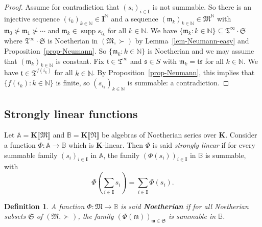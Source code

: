 \documentclass{article}
\newcommand{\of}{:}
\newcommand{\suchthat}{:}
\newcommand{\tmem}[1]{{\em #1\/}}
\newcommand{\tmop}[1]{\ensuremath{\operatorname{#1}}}
\newcommand{\tmstrong}[1]{\textbf{#1}}
\newtheorem{definition}[theorem]{Definition}
\theoremstyle{remark}\newtheorem*{convention*}{Convention}
\begin{document}
\begin{proof}
  Assume for contradiction that $(s_i)_{i \in \mathbf{I}}$ is not summable. So
  there is an injective sequence $(i_k)_{k \in \mathbb{N}} \in
  \mathbf{I}^{\mathbb{N}}$ and a sequence $(\mathfrak{m}_k)_{k \in \mathbb{N}}
  \in \mathfrak{M}^{\mathbb{N}}$ with $\mathfrak{m}_0 \nsucc \mathfrak{m}_1
  \nsucc \cdots$ and $\mathfrak{m}_k \in \tmop{supp} s_{i_k}$ for all $k \in
  \mathbb{N}$. We have $\{ \mathfrak{m}_k \suchthat k \in \mathbb{N} \}
  \subseteq \mathfrak{T}^{\infty} \cdot \mathfrak{S}$ where
  $\mathfrak{T}^{\infty} \cdot \mathfrak{S}$ is Noetherian in $(\mathfrak{M},
  \succ)$ by Lemma~\ref{lem-Neumann-easy} and Proposition~\ref{prop-Neumann}. So $\{
  \mathfrak{m}_k \suchthat k \in \mathbb{N} \}$ is Noetherian and we may
  assume that $(\mathfrak{m}_k)_{k \in \mathbb{N}}$ is constant. Fix
  $\mathfrak{t} \in \mathfrak{T}^{\infty}$ and $\mathfrak{s} \in S$ with
  $\mathfrak{m}_k =\mathfrak{t}\mathfrak{s}$ for all $k \in \mathbb{N}$. We
  have $\mathfrak{t} \in \mathfrak{T}^{f (i_k)}$ for all $k \in \mathbb{N}$.
  By Proposition~\ref{prop-Neumann}, this implies that $\{ f (i_k) \suchthat k \in
  \mathbb{N} \}$ is finite, so $(s_{i_k})_{k \in \mathbb{N}}$ is summable: a
  contradiction.
\end{proof}

\subsection{Strongly linear functions}

Let $\mathbb{A}= \mathbf{K} \llbracket \mathfrak{M} \rrbracket$ and
$\mathbb{B}= \mathbf{K} \llbracket \mathfrak{N} \rrbracket$ be algebras of
Noetherian series over $\mathbf{K}$. Consider a function $\Phi \of \mathbb{A}
\longrightarrow \mathbb{B}$ which is $\mathbf{K}$-linear. Then $\Phi$ is said
{\tmem{strongly linear}}{} if for every
summable family $(s_i)_{i \in \mathbf{I}}$ in $\mathbb{A}$, the family $(\Phi
(s_i))_{i \in \mathbf{I}}$ in $\mathbb{B}$ is summable, with
\[ \Phi \left( \sum_{i \in \mathbf{I}} s_i \right) = \sum_{i \in \mathbf{I}}
   \Phi (s_i) . \]
\begin{definition}
  A function $\Phi \of \mathfrak{M} \longrightarrow \mathbb{B}$ is said
  {\tmstrong{{\tmem{Noetherian}}}}{} if for all
  Noetherian subsets $\mathfrak{S}$ of $(\mathfrak{M}, \succ)$, the family
  $(\Phi (\mathfrak{m}))_{\mathfrak{m} \in \mathfrak{S}}$ is summable in
  $\mathbb{B}$.
\end{definition}
\end{document}

